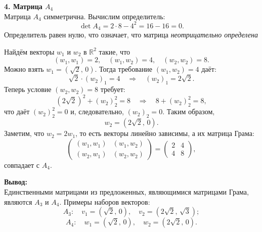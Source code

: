 \documentclass[a4paper]{article}
\begin{document}
\begin{enumerate}
    \textbf{4. Матрица \(A_4\)}\\
    Матрица \(A_4\) симметрична. Вычислим определитель:
    \[
    \det A_4 = 2\cdot 8 - 4^2 = 16-16 = 0.
    \]
    Определитель равен нулю, что означает, что матрица \emph{неотрицательно определена}

    Найдём векторы \(w_1\) и \(w_2\) в \(\mathbb{R}^2\) такие, что
    \[
    (w_1,w_1)=2,\quad (w_1,w_2)=4,\quad (w_2,w_2)=8.
    \]
    Можно взять \(w_1=(\sqrt{2},\,0)\). Тогда требование \((w_1,w_2)=4\) даёт:
    \[
    \sqrt{2}\cdot (w_2)_1 = 4 \quad \Longrightarrow \quad (w_2)_1=2\sqrt{2}.
    \]
    Теперь условие \((w_2,w_2)=8\) требует:
    \[
    (2\sqrt{2})^2+(w_2)_2^2=8 \quad \Longrightarrow \quad 8+(w_2)_2^2=8,
    \]
    что даёт \((w_2)_2^2=0\) и, следовательно, \((w_2)_2=0\). Таким образом,
    \[
    w_2=(2\sqrt{2},\,0).
    \]
    Заметим, что \(w_2=2w_1\), то есть векторы линейно зависимы, а их матрица Грама:
    \[
    \begin{pmatrix} (w_1,w_1) & (w_1,w_2) \\ (w_2,w_1) & (w_2,w_2) \end{pmatrix} =
    \begin{pmatrix} 2 & 4 \\ 4 & 8 \end{pmatrix},
    \]
    совпадает с \(A_4\).

    \textbf{Вывод:}\\
    Единственными матрицами из предложенных, являющимися матрицами Грама, являются \(A_3\) и \(A_4\). Примеры наборов векторов:
    \[
    A_3: \quad v_1=(\sqrt{2},\,0), \quad v_2=(2\sqrt{2},\,\sqrt{3});
    \]
    \[
    A_4: \quad w_1=(\sqrt{2},\,0), \quad w_2=(2\sqrt{2},\,0).
    \]

\end{enumerate}
\end{document}
